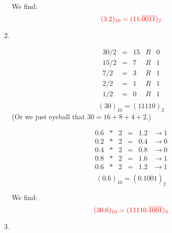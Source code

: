\documentclass[pdftex,11pt]{article}
\begin{document}
\begin{enumerate}
We find:
$$\color{red} (3.2)_{10} = (11.\overline{0011})_2 $$

\item 
~\\

\begin{minipage}{.4\textwidth}
$$
\begin{array}{rcrcc}
30/2  & = &    15 & R & 0 \\
15/2  & = &     7 & R & 1 \\
 7/2  & = &     3 & R & 1 \\
 2/2  & = &     1 & R & 1 \\
 1/2  & = &     0 & R & 1 \\
\end{array}
$$
$$(30)_{10} = (11110)_2$$
(Or we just eyeball that $30=16+8+4+2$.)
\end{minipage}
\begin{minipage}{.4\textwidth}
$$
\begin{array}{rcrccc}
0.6& *& 2   & = & 1.2 &    \rightarrow     1  \\
0.2& *& 2   & = & 0.4 &    \rightarrow     0  \\
0.4& *& 2   & = & 0.8 &    \rightarrow     0  \\
0.8& *& 2   & = & 1.6 &    \rightarrow     1  \\
\hline
0.6& *& 2   & = & 1.2 &    \rightarrow     1  \\
\end{array}
$$
$$ (0.6)_{10} = (0.\overline{1001})_2$$
\end{minipage}

We find:
$$\color{red} (30.6)_{10} = (11110.\overline{1001})_2 $$






\item 
~\\


\end{enumerate}
\end{document}

